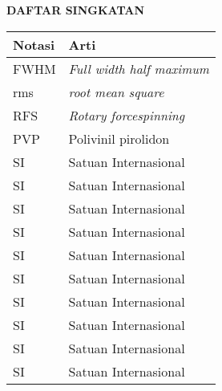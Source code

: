 \clearpage
{}
{}

\begin{center}
    \large \textbf{DAFTAR SINGKATAN}
\end{center}
\vspace{3em}

\begin{center}
    \begin{table}[hb]
        \begin{tabular}{|l|l|}
        \hline
        \textbf{Notasi} & \textbf{Arti}                    \\ \hline
        FWHM            & \textit{Full width half maximum} \\ \hline
        rms             & \textit{root mean square}        \\ \hline
        RFS             & \textit{Rotary forcespinning}    \\ \hline
        PVP             & Polivinil pirolidon              \\ \hline
        SI              & Satuan Internasional             \\ \hline
        SI              & Satuan Internasional             \\ \hline
        SI              & Satuan Internasional             \\ \hline
        SI              & Satuan Internasional             \\ \hline
        SI              & Satuan Internasional             \\ \hline
        SI              & Satuan Internasional             \\ \hline
        SI              & Satuan Internasional             \\ \hline
        SI              & Satuan Internasional             \\ \hline
        SI              & Satuan Internasional             \\ \hline
        SI              & Satuan Internasional             \\ \hline
        \end{tabular}
        \end{table}
\end{center}